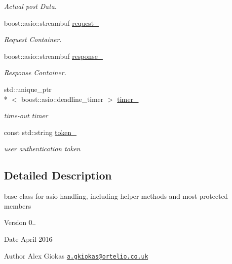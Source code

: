 \begin{DoxyCompactItemize}
\begin{DoxyCompactList}\small\item\em Actual post Data. \end{DoxyCompactList}\item 
boost\-::asio\-::streambuf \hyperlink{classrapp_1_1cloud_1_1asio__handler_a0af7166690e952031a80be61d77faebb}{request\-\_\-}
\begin{DoxyCompactList}\small\item\em Request Container. \end{DoxyCompactList}\item 
boost\-::asio\-::streambuf \hyperlink{classrapp_1_1cloud_1_1asio__handler_a82f38d6e607030e2df7952cc772ce1cd}{response\-\_\-}
\begin{DoxyCompactList}\small\item\em Response Container. \end{DoxyCompactList}\item 
std\-::unique\-\_\-ptr\\*
$<$ boost\-::asio\-::deadline\-\_\-timer $>$ \hyperlink{classrapp_1_1cloud_1_1asio__handler_ad99295ad7fd912df78dcf8955949178a}{timer\-\_\-}
\begin{DoxyCompactList}\small\item\em time-\/out timer \end{DoxyCompactList}\item 
const std\-::string \hyperlink{classrapp_1_1cloud_1_1asio__handler_ad76795ce6386cf5d2f48873defc6148f}{token\-\_\-}
\begin{DoxyCompactList}\small\item\em user authentication token \end{DoxyCompactList}\end{DoxyCompactItemize}


\subsection{Detailed Description}
base class for asio handling, including helper methods and most protected members 

\begin{DoxyVersion}{Version}
0.. 
\end{DoxyVersion}
\begin{DoxyDate}{Date}
April 2016 
\end{DoxyDate}
\begin{DoxyAuthor}{Author}
Alex Giokas \href{mailto:a.gkiokas@ortelio.co.uk}{\tt a.\-gkiokas@ortelio.\-co.\-uk} 
\end{DoxyAuthor}



